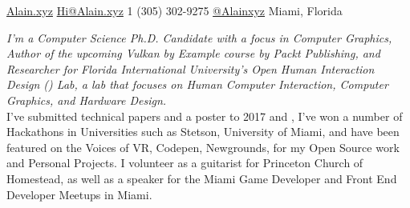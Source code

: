 \documentclass[10pt,a4paper]{article}
\begin{document}
 

\noindent \href{https://alain.xyz}{Alain.xyz} \bull \href{mailto:hi@Alain.xyz}{Hi@Alain.xyz} \bull
\textsmaller{+}1 (305) 302-9275 \bull \href{https://twitter.com/Alainxyz}{@Alainxyz} \bull Miami, Florida

\spacedhrule{0.9em}{-0.4em}



\vspace{-1.3em}

\begin{multicols}{2}
\noindent \textit{I'm a Computer Science Ph.D. Candidate with a focus in Computer Graphics, Author of the upcoming Vulkan by Example course by Packt Publishing, and Researcher for Florida International University's Open Human Interaction Design () Lab, a lab that focuses on Human Computer Interaction, Computer Graphics, and Hardware Design.} \\

I've submitted technical papers and a poster to  2017 and , I've won a number of Hackathons in Universities such as Stetson, University of Miami, and have been featured on the Voices of VR, Codepen, Newgrounds, for my Open Source work and Personal Projects. I volunteer as a guitarist for Princeton Church of Homestead, as well as a speaker for the Miami Game Developer and Front End Developer Meetups in Miami.
\end{multicols}
\end{document}
